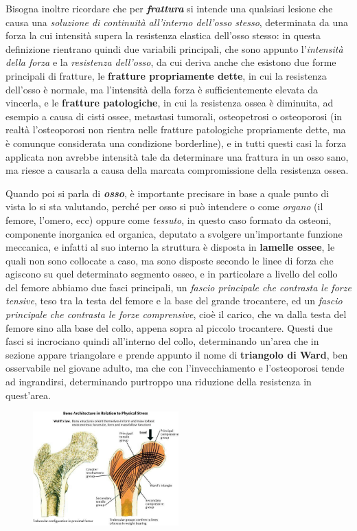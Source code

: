 Bisogna inoltre ricordare che per \textbf{\emph{frattura}} si intende
una qualsiasi lesione che causa una \emph{soluzione di continuità
all'interno dell'osso stesso}, determinata da una forza la cui intensità
supera la resistenza elastica dell'osso stesso: in questa definizione
rientrano quindi due variabili principali, che sono appunto
l'\emph{intensità della forza} e la \emph{resistenza dell'osso}, da cui
deriva anche che esistono due forme principali di fratture, le
\textbf{fratture propriamente dette}, in cui la resistenza dell'osso è
normale, ma l'intensità della forza è sufficientemente elevata da
vincerla, e le \textbf{fratture patologiche}, in cui la resistenza ossea
è diminuita, ad esempio a causa di cisti ossee, metastasi tumorali,
osteopetrosi o osteoporosi (in realtà l'osteoporosi non rientra nelle
fratture patologiche propriamente dette, ma è comunque considerata una
condizione borderline), e in tutti questi casi la forza applicata non
avrebbe intensità tale da determinare una frattura in un osso sano, ma
riesce a causarla a causa della marcata compromissione della resistenza
ossea.

Quando poi si parla di \textbf{\emph{osso}}, è importante precisare in
base a quale punto di vista lo si sta valutando, perché per osso si può
intendere o come \emph{organo} (il femore, l'omero, ecc) oppure come
\emph{tessuto}, in questo caso formato da osteoni, componente inorganica
ed organica, deputato a svolgere un'importante funzione meccanica, e
infatti al suo interno la struttura è disposta in \textbf{lamelle
ossee}, le quali non sono collocate a caso, ma sono disposte secondo le
linee di forza che agiscono su quel determinato segmento osseo, e in
particolare a livello del collo del femore abbiamo due fasci principali,
un \emph{fascio principale che contrasta le forze tensive}, teso tra la
testa del femore e la base del grande trocantere, ed un \emph{fascio
principale che contrasta le forze comprensive}, cioè il carico, che va
dalla testa del femore sino alla base del collo, appena sopra al piccolo
trocantere. Questi due fasci si incrociano quindi all'interno del collo,
determinando un'area che in sezione appare triangolare e prende appunto
il nome di \textbf{triangolo di Ward}, ben osservabile nel giovane
adulto, ma che con l'invecchiamento e l'osteoporosi tende ad
ingrandirsi, determinando purtroppo una riduzione della resistenza in
quest'area.
\begin{figure}[!ht]
\centering
	\includegraphics[width=0.5\textwidth]{007/image2.jpeg}
\end{figure}
